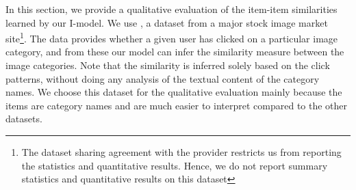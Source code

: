 In this section, we provide a qualitative evaluation of the item-item similarities learned by our I-\LinearLow model. 
We use \Fotolia, a dataset from a major stock image market site\footnote{\scriptsize The dataset sharing agreement with the provider restricts us from reporting the statistics and quantitative results. Hence, we do not report summary statistics and quantitative results on this dataset}.  
The data provides whether a given user has clicked on a particular image category, and from these our model can infer the similarity measure between
the image categories. Note that the similarity is inferred solely based on the click patterns, without doing any analysis of the textual content of
the category names.
We choose this dataset for the qualitative evaluation mainly because the items are category names and are much easier to interpret
compared to the other datasets.






